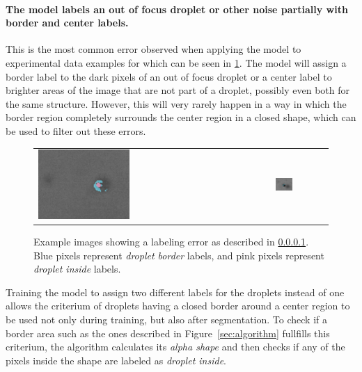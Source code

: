\paragraph{The model labels an out of focus droplet or other noise partially with border and center labels.}
\label{sec:partially_wrong}
This is the most common error observed when applying the model to experimental data examples for which can be seen in \ref{fig:partially_wrong}.
The model will assign a border label to the dark pixels of an out of focus droplet or a center label to brighter areas of the image that are not part of a droplet, possibly even both for the same structure.
However, this will very rarely happen in a way in which the border region completely surrounds the center region in a closed shape, which can be used to filter out these errors.

\begin{figure}[htbp]
    \centering
    \begin{tabular}{ll}
        \includegraphics[width=0.4\textwidth]{images/bad1.png}
        &
        \includegraphics[width=0.35\textwidth]{images/bad2.png}
    \end{tabular}
    \caption{Example images showing a labeling error as described in \ref{sec:partially_wrong}. Blue pixels represent \emph{droplet border} labels, and pink pixels represent \emph{droplet inside} labels.}
    \label{fig:partially_wrong}
\end{figure}

Training the model to assign two different labels for the droplets instead of one allows the criterium of droplets having a closed border around a center region to be used not only during training, but also after segmentation.
To check if a border area such as the ones described in Figure~\ref{sec:algorithm} fullfills this criterium, the algorithm calculates its \emph{alpha shape} and then checks if any of the pixels inside the shape are labeled as \emph{droplet inside}.

